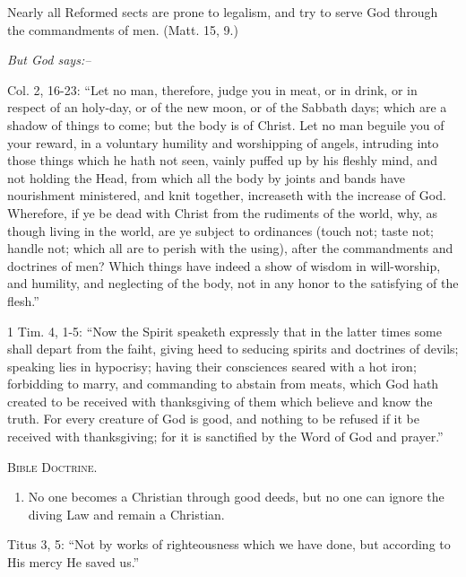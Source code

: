 \documentclass[
]{book}
\providecommand{\tightlist}{%
  \setlength{\itemsep}{0pt}\setlength{\parskip}{0pt}}
\begin{document}
Nearly all Reformed sects are prone to legalism, and try to serve God through the commandments of men. (Matt. 15, 9.)

\begin{center}
\textsl{But God says:--}
\end{center}

Col. 2, 16-23: ``Let no man, therefore, judge you in meat, or in drink, or in respect of an holy-day, or of the new moon, or of the Sabbath days; which are a shadow of things to come; but the body is of Christ. Let no man beguile you of your reward, in a voluntary humility and worshipping of angels, intruding into those things which he hath not seen, vainly puffed up by his fleshly mind, and not holding the Head, from which all the body by joints and bands have nourishment ministered, and knit together, increaseth with the increase of God. Wherefore, if ye be dead with Christ from the rudiments of the world, why, as though living in the world, are ye subject to ordinances (touch not; taste not; handle not; which all are to perish with the using), after the commandments and doctrines of men? Which things have indeed a show of wisdom in will-worship, and humility, and neglecting of the body, not in any honor to the satisfying of the flesh.''

1 Tim. 4, 1-5: ``Now the Spirit speaketh expressly that in the latter times some shall depart from the faiht, giving heed to seducing spirits and doctrines of devils; speaking lies in hypocrisy; having their consciences seared with a hot iron; forbidding to marry, and commanding to abstain from meats, which God hath created to be received with thanksgiving of them which believe and know the truth. For every creature of God is good, and nothing to be refused if it be received with thanksgiving; for it is sanctified by the Word of God and prayer.''

\begin{center}
\textsc{Bible Doctrine.}
\end{center}

\begin{enumerate}
\def\labelenumi{\alph{enumi}.}
\setcounter{enumi}{4}
\tightlist
\item
  No one becomes a Christian through good deeds, but no one can ignore the diving Law and remain a Christian.
\end{enumerate}

Titus 3, 5: ``Not by works of righteousness which we have done, but according to His mercy He saved us.''
\end{document}
